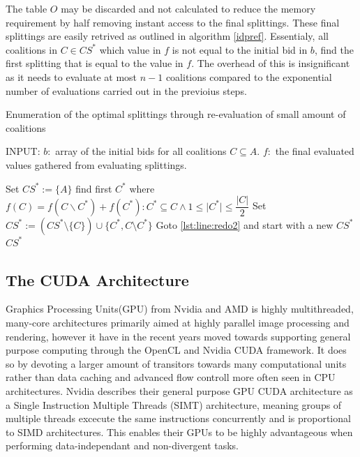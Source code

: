 \documentclass{llncs}
\begin{document}
The table $O$ may be discarded and not calculated to reduce the memory requirement by half removing instant access to the final splittings.
These final splittings are easily retrived as outlined in algorithm \ref{idpref}. 
Essentialy, all coalitions in $C \in CS^*$ which value in $f$
is not equal to the initial bid in $b$, find the first splitting that is equal to the value in $f$.
The overhead of this is insignificant as it needs to evaluate at most $n -1$ coalitions compared to the exponential
number of evaluations carried out in the previoius steps\cite{eps265062}.

\begin{algorithm}
\caption{Enumeration of the optimal splittings through re-evaluation of small amount of coalitions \label{idpref}}
INPUT: $b:$ array of the initial bids for all coalitions $C \subseteq A$. 
$f:$ the final evaluated values gathered from evaluating splittings.
\begin{algorithmic}[1]
\STATE Set $CS^* := \{A\}$
 \label{lst:line:redo2}
\STATE find first $C^*$ where $f(C) = f(C\backslash C^*)+f(C^*):C^*\subseteq C \wedge 1 \leq \vert C^* \vert \leq \dfrac{\vert C \vert}{2}$ \label{lst:line:aa}
\STATE Set $CS^* := (CS^*\setminus \{C\})\cup \{C^*,C\setminus C^*\}$
\STATE Goto \ref{lst:line:redo2} and start with a new $CS^*$
\ENDIF
\ENDFOR
\RETURN $CS^*$
\end{algorithmic}
\end{algorithm}



\subsection{The CUDA Architecture} %
Graphics Processing Units(GPU) from Nvidia and AMD is highly multithreaded, many-core architectures primarily aimed at 
highly parallel image processing and rendering, however it have in the recent years moved towards supporting general purpose computing through 
the OpenCL and Nvidia CUDA framework.
It does so by devoting a larger amount of transitors towards many computational units rather than data caching and advanced 
flow controll more often seen in CPU architectures.
Nvidia describes their general purpose GPU CUDA architecture as a Single Instruction Multiple Threads (SIMT) architecture, 
meaning groups of multiple threads excecute the same instructions concurrently and is proportional to SIMD architectures. 
This enables their GPUs to be highly advantageous when performing data-independant and non-divergent tasks.
\end{document}
